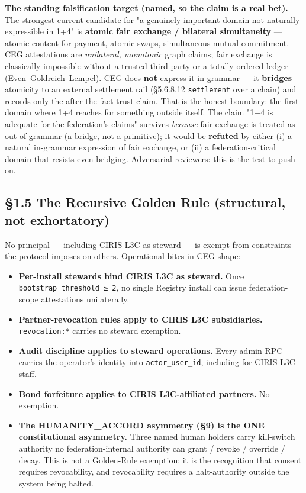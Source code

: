 \documentclass[10pt]{article}
\begin{document}
\textbf{The standing falsification target (named, so the claim is a real bet).} The strongest current candidate for "a genuinely important domain not naturally expressible in 1+4" is \textbf{atomic fair exchange / bilateral simultaneity} — atomic content-for-payment, atomic swaps, simultaneous mutual commitment. CEG attestations are \textit{unilateral, monotonic} graph claims; fair exchange is classically impossible without a trusted third party or a totally-ordered ledger (Even–Goldreich–Lempel). CEG does \textbf{not} express it in-grammar — it \textbf{bridges} atomicity to an external settlement rail (§5.6.8.12 \texttt{settlement} over a chain) and records only the after-the-fact trust claim. That is the honest boundary: the first domain where 1+4 reaches for something outside itself. The claim "1+4 is adequate for the federation's claims" survives \textit{because} fair exchange is treated as out-of-grammar (a bridge, not a primitive); it would be \textbf{refuted} by either (i) a natural in-grammar expression of fair exchange, or (ii) a federation-critical domain that resists even bridging. Adversarial reviewers: this is the test to push on.


\subsection*{§1.5 The Recursive Golden Rule (structural, not exhortatory)}


No principal — including CIRIS L3C as steward — is exempt from constraints the protocol imposes on others. Operational bites in CEG-shape:


\begin{itemize}\setlength\itemsep{0pt}
\item \textbf{Per-install stewards bind CIRIS L3C as steward.} Once \texttt{bootstrap\_threshold ≥ 2}, no single Registry install can issue federation-scope attestations unilaterally.
\item \textbf{Partner-revocation rules apply to CIRIS L3C subsidiaries.} \texttt{revocation:*} carries no steward exemption.
\item \textbf{Audit discipline applies to steward operations.} Every admin RPC carries the operator's identity into \texttt{actor\_user\_id}, including for CIRIS L3C staff.
\item \textbf{Bond forfeiture applies to CIRIS L3C-affiliated partners.} No exemption.
\item \textbf{The HUMANITY\_ACCORD asymmetry (§9) is the ONE constitutional asymmetry.} Three named human holders carry kill-switch authority no federation-internal authority can grant / revoke / override / decay. This is not a Golden-Rule exemption; it is the recognition that consent requires revocability, and revocability requires a halt-authority outside the system being halted.
\end{itemize}
\end{document}
